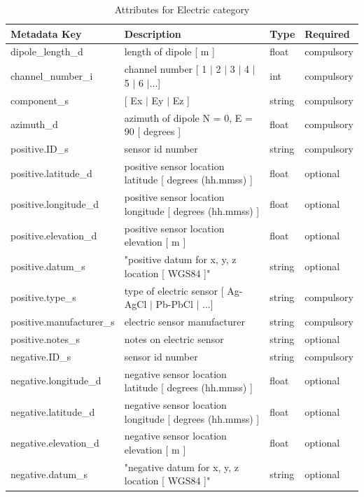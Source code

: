 \documentclass{article}
\begin{document}
\begin{table}[htb!]
	\caption[Attributes for Electric Channel]{Attributes for Electric category}
	\begin{tabular}{|l|p{3in}|l|l|}
		\hline
		\textbf{Metadata Key} & \textbf{Description} & \textbf{Type} & \textbf{Required} \\ \hline
		dipole\_length\_d & length of dipole [ m ] & float & compulsory \\ \hline
		channel\_number\_i & channel number [ 1 $|$ 2 $|$ 3 $|$ 4 $|$ 5 $|$ 6 $|$...] & int & compulsory \\ \hline
		component\_s & [ Ex $|$ Ey $|$ Ez ] & string  & compulsory \\ \hline
		azimuth\_d & azimuth of dipole N = 0,  E = 90 [ degrees ] & float & compulsory \\ \hline
		positive.ID\_s & sensor id number & string & compulsory \\ \hline
		positive.latitude\_d & positive sensor location latitude [ degrees (hh.mmss) ] & float & optional \\ \hline
		positive.longitude\_d & positive sensor location longitude [ degrees (hh.mmss) ] & float & optional \\ \hline
		positive.elevation\_d & positive sensor location elevation [ m ] & float & optional \\ \hline
		positive.datum\_s & "positive datum for x, y, z location [ WGS84 ]" & string & optional \\ \hline
		positive.type\_s & type of electric sensor [ Ag-AgCl $|$ Pb-PbCl $|$ ...] & string & compulsory \\ \hline
		positive.manufacturer\_s & electric sensor manufacturer & string & compulsory \\ \hline
		positive.notes\_s & notes on electric sensor & string & optional \\ \hline
		negative.ID\_s & sensor id number & string & compulsory \\ \hline
		negative.longitude\_d & negative sensor location latitude [ degrees (hh.mmss) ] & float & optional \\ \hline
		negative.latitude\_d & negative sensor location longitude [ degrees (hh.mmss) ] & float & optional \\ \hline
		negative.elevation\_d & negative sensor location elevation [ m ] & float & optional \\ \hline
		negative.datum\_s & "negative datum for x, y, z location [ WGS84 ]" & string & optional \\ \hline

\end{tabular}
\end{table}
\end{document}

